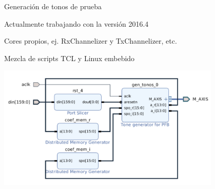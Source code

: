 \documentclass[ignorenonframetext,12pt]{beamer}
\begin{document}
\begin{frame}{Generación de tonos de prueba}

				Actualmente trabajando con la versi\'on 2016.4

				Cores propios, ej. RxChannelizer y TxChannelizer, etc.

				Mezcla de scripts TCL y Linux embebido
				\begin{center}
								\includegraphics[width=0.8\textwidth]{gen_tonos_vivado}
				\end{center}
\end{frame}
\end{document}
